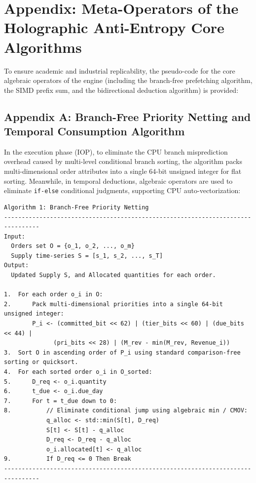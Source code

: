 \documentclass{article}
\begin{document}
\newpage
\section*{Appendix: Meta-Operators of the Holographic Anti-Entropy Core Algorithms}

To ensure academic and industrial replicability, the pseudo-code for the core algebraic operators of the engine (including the branch-free prefetching algorithm, the SIMD prefix sum, and the bidirectional deduction algorithm) is provided:

\subsection*{Appendix A: Branch-Free Priority Netting and Temporal Consumption Algorithm}

In the execution phase (IOP), to eliminate the CPU branch misprediction overhead caused by multi-level conditional branch sorting, the algorithm packs multi-dimensional order attributes into a single 64-bit unsigned integer for flat sorting. Meanwhile, in temporal deductions, algebraic operators are used to eliminate \texttt{if-else} conditional judgments, supporting CPU auto-vectorization:

\begin{verbatim}
Algorithm 1: Branch-Free Priority Netting
--------------------------------------------------------------------------------
Input: 
  Orders set O = {o_1, o_2, ..., o_m}
  Supply time-series S = [s_1, s_2, ..., s_T]
Output: 
  Updated Supply S, and Allocated quantities for each order.

1.  For each order o_i in O:
2.      Pack multi-dimensional priorities into a single 64-bit unsigned integer:
        P_i <- (committed_bit << 62) | (tier_bits << 60) | (due_bits << 44) | 
              (pri_bits << 28) | (M_rev - min(M_rev, Revenue_i))
3.  Sort O in ascending order of P_i using standard comparison-free sorting or quicksort.
4.  For each sorted order o_i in O_sorted:
5.      D_req <- o_i.quantity
6.      t_due <- o_i.due_day
7.      For t = t_due down to 0:
8.          // Eliminate conditional jump using algebraic min / CMOV:
            q_alloc <- std::min(S[t], D_req)
            S[t] <- S[t] - q_alloc
            D_req <- D_req - q_alloc
            o_i.allocated[t] <- q_alloc
9.          If D_req <= 0 Then Break
--------------------------------------------------------------------------------
\end{verbatim}
\end{document}
